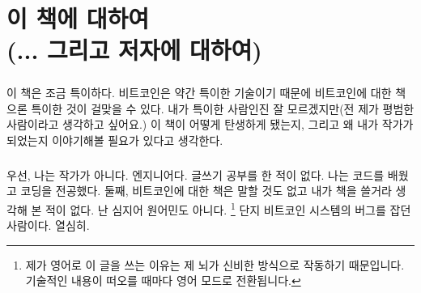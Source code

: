 
\def\bitcoinB{\leavevmode
	{\setbox0=\hbox{\textsf{B}}%
		\dimen0\ht0 \advance\dimen0 0.2ex
		\ooalign{\hfil \box0\hfil\cr
			\hfil\vrule height \dimen0 depth.2ex\hfil\cr
		}%
	}%
}

\chapter*{이 책에 대하여 \\ (... 그리고 저자에 대하여)}


\paragraph{}
이 책은 조금 특이하다. 
비트코인은 약간 특이한 기술이기 때문에 비트코인에 대한 책으론 특이한 것이 걸맞을 수 있다. 
내가 특이한 사람인진 잘 모르겠지만(전 제가 평범한 사람이라고 생각하고 싶어요.) 
이 책이 어떻게 탄생하게 됐는지, 그리고 왜 내가 작가가 되었는지 이야기해볼 필요가 있다고 생각한다.


\paragraph{}
우선, 나는 작가가 아니다. 엔지니어다. 글쓰기 공부를 한 적이 없다. 나는 코드를 배웠고 코딩을 전공했다. 
둘째, 비트코인에 대한 책은 말할 것도 없고 내가 책을 쓸거라 생각해 본 적이 없다. 난 심지어 원어민도 아니다. 
\footnote{제가 영어로 이 글을 쓰는 이유는 제 뇌가 신비한 방식으로 작동하기 때문입니다. 기술적인 내용이 떠오를 때마다 영어 모드로 전환됩니다.}
단지 비트코인 시스템의 버그를 잡던 사람이다. 열심히.



